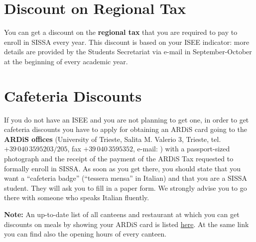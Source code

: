 \documentclass{sissavademecum}
\begin{document}
\section{Discount on Regional Tax}

You can get a discount on the \textbf{regional tax} that you are required to pay to enroll in SISSA every year. This discount is based on your ISEE indicator: more details are provided by the Students Secretariat via e-mail in September-October at the beginning of every academic year.


\section{Cafeteria Discounts}

If you do not have an ISEE and you are not planning to get one, in order to get cafeteria discounts you have to apply for obtaining an ARDiS card going to the \textbf{ARDiS offices} (University of Trieste, Salita M. Valerio 3, Trieste, tel. $+39 \, 040 \, 3595203/205$, fax $+39 \, 040 \, 3595352$, e-mail: ) with a passport-sized photograph and the receipt of the payment of the ARDiS Tax requested to formally enroll in SISSA. As soon as you get there, you should state that you want a ``cafeteria badge'' (``tessera mensa'' in Italian) and that you are a SISSA student. They will ask you to fill in a paper form. We strongly advise you to go there with someone who speaks Italian fluently.

\textbf{Note:} An up-to-date list of all canteens and restaurant at which you can get discounts on meals by showing your ARDiS card is listed \href{http://www.ardiss.fvg.it/contenuti.php?view=page&id=214#scheda532}{here}. At the same link you can find also the opening hours of every canteen.
\end{document}
